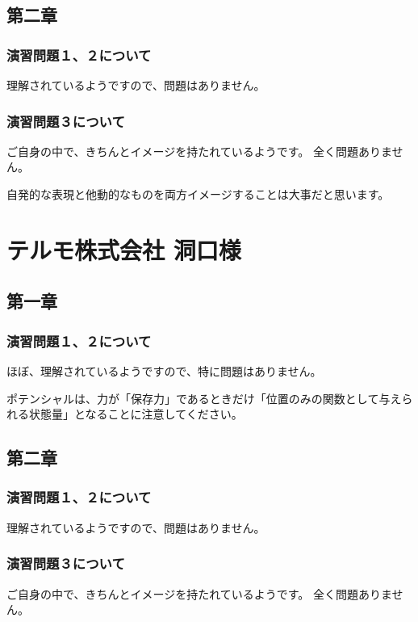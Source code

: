 \documentclass[uplatex,dvipdfmx,a4paper,11pt]{jsreport}
\begin{document}
\subsection*{第二章}
\subsubsection*{演習問題１、２について}
理解されているようですので、問題はありません。

\subsubsection*{演習問題３について}

ご自身の中で、きちんとイメージを持たれているようです。
全く問題ありません。

自発的な表現と他動的なものを両方イメージすることは大事だと思います。

\clearpage

\section*{テルモ株式会社 洞口様}
\subsection*{第一章}
\subsubsection*{演習問題１、２について}
ほぼ、理解されているようですので、特に問題はありません。

ポテンシャルは、力が「保存力」であるときだけ「位置のみの関数として与えられる状態量」となることに注意してください。

\subsection*{第二章}
\subsubsection*{演習問題１、２について}
理解されているようですので、問題はありません。

\subsubsection*{演習問題３について}

ご自身の中で、きちんとイメージを持たれているようです。
全く問題ありません。
\end{document}
